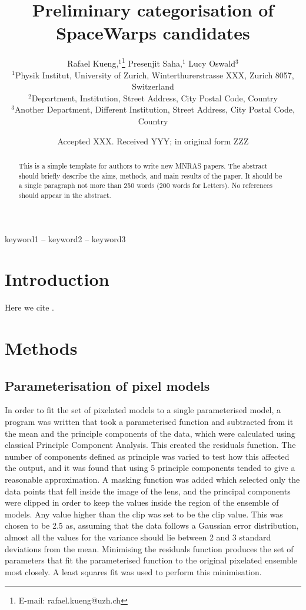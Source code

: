\documentclass[fleqn,usenatbib]{mnras}
\title[Short title, max. 45 characters]{Preliminary categorisation of SpaceWarps candidates}
\author[R. Kueng et al.]{
Rafael Kueng,$^{1}$\thanks{E-mail: rafael.kueng@uzh.ch}
Presenjit Saha,$^{1}$
Lucy Oswald$^{3}$
\\
$^{1}$Physik Institut, University of Zurich, Winterthurerstrasse XXX, Zurich 8057, Switzerland\\
$^{2}$Department, Institution, Street Address, City Postal Code, Country\\
$^{3}$Another Department, Different Institution, Street Address, City Postal Code, Country
}
\date{Accepted XXX. Received YYY; in original form ZZZ}
\begin{document}
\label{firstpage}
\pagerange{\pageref{firstpage}--\pageref{lastpage}}
\maketitle

\begin{abstract}
This is a simple template for authors to write new MNRAS papers.
The abstract should briefly describe the aims, methods, and main results of the paper.
It should be a single paragraph not more than 250 words (200 words for Letters).
No references should appear in the abstract.
\end{abstract}

\begin{keywords}
keyword1 -- keyword2 -- keyword3
\end{keywords}


\section{Introduction}

Here we cite \cite{2015MNRAS.447.2170K}.

\section{Methods}

\subsection{Parameterisation of pixel models} \label{sec:parameter}
In order to fit the set of pixelated models to a single parameterised model, a program was written that took a parameterised function and subtracted from it the mean and the principle components of the data, which were calculated using classical Principle Component Analysis.
This created the residuals function.
The number of components defined as principle was varied to test how this affected the output, and it was found that using 5 principle components tended to give a reasonable approximation.
A masking function was added which selected only the data points that fell inside the image of the lens, and the principal components were clipped in order to keep the values inside the region of the ensemble of models.
Any value higher than the clip was set to be the clip value.
This was chosen to be 2.5 as, assuming that the data follows a Gaussian error distribution, almost all the values for the variance should lie between 2 and 3 standard deviations from the mean.
Minimising the residuals function produces the set of parameters that fit the parameterised function to the original pixelated ensemble most closely.
A least squares fit was used to perform this minimisation.
\end{document}
